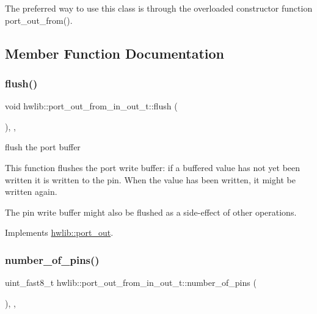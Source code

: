 The preferred way to use this class is through the overloaded constructor function port\+\_\+out\+\_\+from(). 

\subsection{Member Function Documentation}
\mbox{\label{classhwlib_1_1port__out__from__in__out__t_a568ad753e6063bca9ecea4afe5d941b2}} 
\subsubsection{\texorpdfstring{flush()}{flush()}}
{\footnotesize\ttfamily void hwlib\+::port\+\_\+out\+\_\+from\+\_\+in\+\_\+out\+\_\+t\+::flush (\begin{DoxyParamCaption}{ }\end{DoxyParamCaption})\hspace{0.3cm}{\ttfamily [inline]}, {\ttfamily [override]}, {\ttfamily [virtual]}}





flush the port buffer

This function flushes the port write buffer\+: if a buffered value has not yet been written it is written to the pin. When the value has been written, it might be written again.

The pin write buffer might also be flushed as a side-\/effect of other operations. 

Implements \hyperlink{classhwlib_1_1port__out_aff7c8d768ec0b7f3d738a47ef1a4bbfe}{hwlib\+::port\+\_\+out}.

\mbox{\label{classhwlib_1_1port__out__from__in__out__t_a0daa8725e2de27b9071505fa198b4b78}} 
\subsubsection{\texorpdfstring{number\+\_\+of\+\_\+pins()}{number\_of\_pins()}}
{\footnotesize\ttfamily uint\+\_\+fast8\+\_\+t hwlib\+::port\+\_\+out\+\_\+from\+\_\+in\+\_\+out\+\_\+t\+::number\+\_\+of\+\_\+pins (\begin{DoxyParamCaption}{ }\end{DoxyParamCaption})\hspace{0.3cm}{\ttfamily [inline]}, {\ttfamily [override]}, {\ttfamily [virtual]}}





